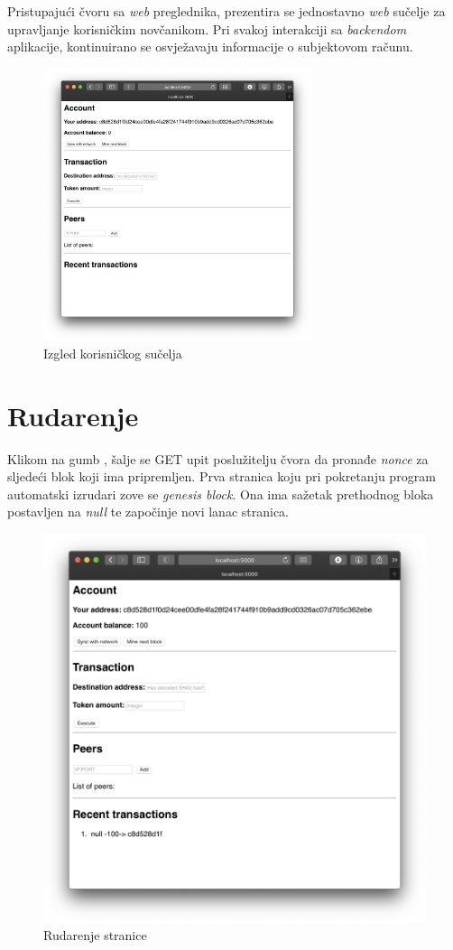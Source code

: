 \documentclass[utf8, zavrsni]{fer}
\begin{document}
Pristupajući čvoru sa \textit{web} preglednika, prezentira se jednostavno \textit{web} sučelje za upravljanje korisničkim novčanikom. Pri svakoj interakciji sa \textit{backendom} aplikacije, kontinuirano se osvježavaju informacije o subjektovom računu.
\begin{figure}[H]
    \centering
    \includegraphics[width=0.7\textwidth]{sucelje}
    \caption{Izgled korisničkog sučelja}
    \label{fig:sucelje}
\end{figure}
\newpage
\section{Rudarenje}
Klikom na gumb , šalje se GET upit poslužitelju čvora da pronađe \textit{nonce} za sljedeći blok koji ima pripremljen. Prva stranica koju pri pokretanju program automatski izrudari zove se \textit{genesis block}. Ona ima sažetak prethodnog bloka postavljen na \textit{null} te započinje novi lanac stranica.
\begin{figure}[H]
    \centering
    \includegraphics[width=\textwidth]{rudarenje}
    \caption{Rudarenje stranice}
    \label{fig:rudarenje}
\end{figure}
\end{document}
